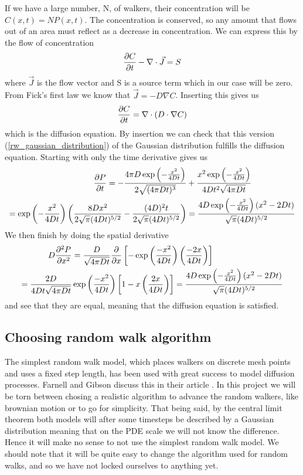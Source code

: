 If we have a large number, N, of walkers, their concentration will be $C(x,t) = NP(x,t)$. 
The concentration is conserved, so any amount that flows out of an area must reflect as a decrease in concentration. 
We can express this by the flow of concentration
\begin{equation}
 \frac{\partial C}{\partial t} -\nabla\cdot\vec{J} = S
\end{equation}
where $\vec{J}$ is the flow vector and S is a source term which in our case will be zero.
From Fick's first law we know that $\vec{J} = -D\nabla C$. Inserting this gives us
\begin{equation}\label{simple_diffusion_equation}
 \frac{\partial C}{\partial t} = \nabla\cdot \left(D\cdot\nabla C\right)
\end{equation}
which is the diffusion equation.
By insertion we can check that this version (\ref{rw_gaussian_distribution}) of the Gaussian distribution fulfills the diffusion equation. 
Starting with only the time derivative gives us
\begin{align*}
 \frac{\partial P}{\partial t} = -\frac{4\pi D\exp\left(-\frac{x^2}{4Dt}\right)}{2\sqrt{(4\pi Dt)^3}}&+\frac{x^2\exp\left(-\frac{x^2}{4Dt}\right)}{4Dt^2\sqrt{4\pi Dt}} \\
 = \exp\left(-\frac{x^2}{4Dt}\right)\left(\frac{8Dx^2}{2\sqrt{\pi}(4Dt)^{5/2}} -\frac{(4D)^2t}{2\sqrt{\pi}(4Dt)^{5/2}}\right)&= \frac{4D\exp\left(-\frac{x^2}{4Dt}\right)(x^2-2Dt)}{\sqrt{\pi}(4Dt)^{5/2}}
\end{align*}
 We then finish by doing the spatial derivative
\begin{align*}
 D\frac{\partial^2 P}{\partial x^2} &= \frac{D}{\sqrt{4\pi Dt}}\frac{\partial}{\partial x}\left[-\exp\left(\frac{-x^2}{4Dt}\right)\left(\frac{-2x}{4Dt}\right)\right]\\
 = \frac{2D}{4Dt\sqrt{4\pi Dt}}&\exp\left(\frac{-x^2}{4Dt}\right)\left[1-x\left(\frac{2x}{4Dt}\right)\right] = \frac{4D\exp\left(-\frac{x^2}{4Dt}\right)(x^2-2Dt)}{\sqrt{\pi}(4Dt)^{5/2}}
\end{align*}
and see that they are equal, meaning that the diffusion equation is satisfied.

\subsection{Choosing random walk algorithm}\label{choosing_random_walk_algorithm}

The simplest random walk model, which places walkers on discrete mesh points and uses a fixed step length, has been used with great success to model diffusion processes. 
Farnell and Gibson discuss this in their article \cite{farnell2005monte}. 
In this project we will be torn between chosing a realistic algorithm to advance the random walkers, like brownian motion or to go for simplicity. 
That being said, by the central limit theorem both models will after some timesteps be described by a Gaussian distribution meaning that on the PDE scale we will not know the difference. 
Hence it will make no sense to not use the simplest random walk model.
We should note that it will be quite easy to change the algorithm used for random walks, and so we have not locked ourselves to anything yet.

